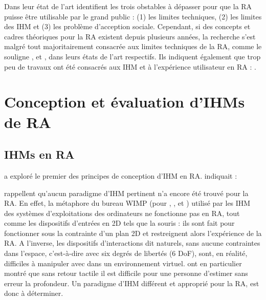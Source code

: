 



Dans leur état de l'art \cite{Azuma2001} identifient les trois obstables à dépasser pour que la RA puisse être utilisable par le grand public : (1) les limites techniques, (2) les limites des IHM et (3) les problème d'acception sociale. Cependant, si des concepts et cadres théoriques pour la RA existent depuis plusieurs années, la recherche s'est malgré tout majoritairement consacrée aux limites techniques de la RA, comme le souligne \cite{Zhou2008}, \cite{VanKrevelen2010} et \cite{Billinghurst2015}, dans leurs états de l'art respectifs. Ils indiquent également que trop peu de travaux ont été consacrés aux IHM et à l'expérience utilisateur en RA :  \citep{Billinghurst2015}.


\section{Conception et évaluation d'IHMs de RA}
\subsection{IHMs en RA}
\cite{Billinghurst2005} a exploré le premier des principes de conception d'IHM en RA. indiquait : 

\citet{VanKrevelen2010} rappellent qu'aucun paradigme d'IHM pertinent n'a encore été trouvé pour la RA. En effet, la métaphore du bureau WIMP (pour , ,  et ) utilisé par les IHM des systèmes d'exploitations des ordinateurs ne fonctionne pas en RA, tout comme les dispositifs d'entrées en 2D tels que la souris : ils sont fait pour fonctionner sous la contrainte d'un plan 2D et restreignent alors l'expérience de la RA. \citep{VanKrevelen2010} A l'inverse, les dispositifs d'interactions dit naturels, sans aucune contraintes dans l'espace, c'est-à-dire avec six degrés de libertés (6 DoF), sont, en réalité, difficiles à manipuler avec dans un environnement virtuel. \citet{ChanKaoChenEtAl2010} ont en particulier montré que sans retour tactile il est difficile pour une personne d'estimer sans erreur la profondeur. Un paradigme d'IHM différent et approprié pour la RA, est donc à déterminer.

